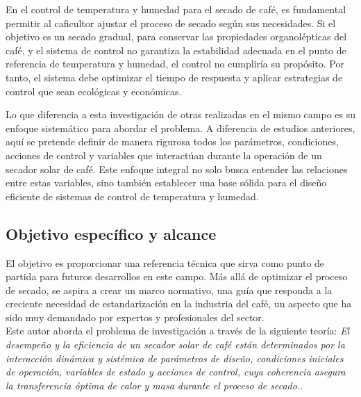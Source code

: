 \documentclass[12pt]{article}
\begin{document}
En el control de temperatura y humedad para el secado de café, es fundamental permitir al caficultor ajustar el proceso de secado según sus necesidades. Si el objetivo es un secado gradual, para conservar las propiedades organolépticas del café, y el sistema de control no garantiza la estabilidad adecuada en el punto de referencia de temperatura y humedad, el control no cumpliría su propósito. Por tanto, el sistema debe optimizar el tiempo de respuesta y aplicar estrategias de control que sean ecológicas y económicas.\\

\clearpage



Lo que diferencia a esta investigación de otras realizadas en el mismo campo es su enfoque sistemático para abordar el problema. A diferencia de estudios anteriores, aquí se pretende definir de manera rigurosa todos los parámetros, condiciones, acciones de control y variables que interactúan durante la operación de un secador solar de café. Este enfoque integral no solo busca entender las relaciones entre estas variables, sino también establecer una base sólida para el diseño eficiente de sistemas de control de temperatura y humedad.\\



\subsection{Objetivo específico y alcance}


El objetivo es proporcionar una referencia técnica que sirva como punto de partida para futuros desarrollos en este campo. Más allá de optimizar el proceso de secado, se aspira a crear un marco normativo, una guía que responda a la creciente necesidad de estandarización en la industria del café, un aspecto que ha sido muy demandado por expertos y profesionales del sector.\\


Este autor aborda el problema de investigación a través de la siguiente teoría: \textit{El desempeño y la eficiencia de un secador solar de café están determinados por la interacción dinámica y sistémica de parámetros de diseño, condiciones iniciales de operación, variables de estado y acciones de control, cuya coherencia asegura la transferencia óptima de calor y masa durante el proceso de secado.}.\\
\end{document}
